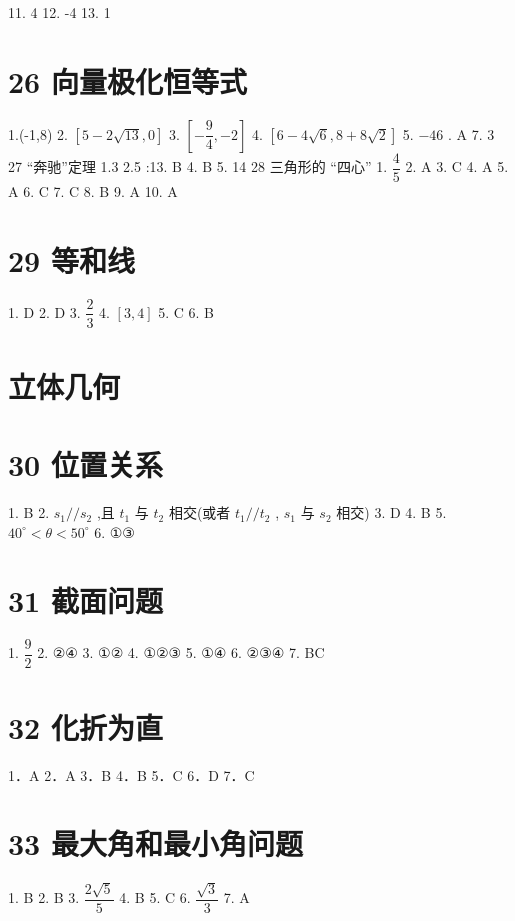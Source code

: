 \documentclass[10pt]{article}
\begin{document}
11. 4 12. -4 13. 1

\section*{26 向量极化恒等式}

1.(-1,8) 2. $\left\lbrack  {5 - 2\sqrt{13},0}\right\rbrack$ 3. $\left\lbrack  {-\dfrac{9}{4}, - 2}\right\rbrack$ 4. $\left\lbrack  {6 - 4\sqrt{6},8 + 8\sqrt{2}}\right\rbrack$ 5. $- 46$ . A 7. 3 27 “奔驰”定理 1.3 2.5 :13. B 4. B 5. 14 28 三角形的 “四心” 1. $\dfrac{4}{5}$ 2. A 3. C 4. A 5. A 6. C 7. C 8. B 9. A 10. A

\section*{29 等和线}

1. D 2. D 3. $\dfrac{2}{3}$ 4. $\left\lbrack  {3,4}\right\rbrack$ 5. C 6. B

\section*{立体几何}

\section*{30 位置关系}

1. B 2. ${s}_{1}//{s}_{2}$ ,且 ${t}_{1}$ 与 ${t}_{2}$ 相交(或者 ${t}_{1}//{t}_{2}$ , ${s}_{1}$ 与 ${s}_{2}$ 相交) 3. D 4. B 5. ${40}^{ \circ  } < \theta  < {50}^{ \circ  }$ 6. ①③

\section*{31 截面问题}

1. $\dfrac{9}{2}$ 2. ②④ 3. ①② 4. ①②③ 5. ①④ 6. ②③④ 7. BC

\section*{32 化折为直}

1．A 2．A 3．B 4．B 5．C 6．D 7．C

\section*{33 最大角和最小角问题}

1. B 2. B 3. $\dfrac{2\sqrt{5}}{5}$ 4. B 5. C 6. $\dfrac{\sqrt{3}}{3}$ 7. A
\end{document}
